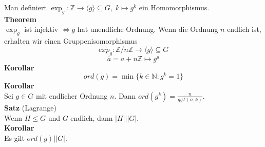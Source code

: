\documentclass[a4paper, 12pt]{article}
\begin{document}
Man definiert $\exp_g: \mathbb{Z} \to \langle g \rangle \subseteq G, \; k \mapsto g^k$ ein Homomorphismus.\\
\textbf{Theorem}\\
$\exp_g$ ist injektiv $\Leftrightarrow g$ hat unendliche Ordnung. Wenn die Ordnung $n$ endlich ist, erhalten wir einen Gruppenisomorphismus \[exp_g: \mathbb{Z}/ n\mathbb{Z} \to \langle g\rangle \subseteq G\]\[\overline{a} = a+n\mathbb{Z} \mapsto g^a\]
\textbf{Korollar}
\[ord(g) = \min\{k \in \mathbb{N}: g^k = 1\}\]
\textbf{Korollar}\\
Sei $g \in G$ mit endlicher Ordnung $n$. Dann $ord(g^k) = \frac{n}{ggT(n,k)}$.\\
\textbf{Satz} (Lagrange)\\
Wenn $H\leq G$ und $G$ endlich, dann $\left|H\right| | \left| G \right|$.\\
\textbf{Korollar}\\
Es gilt $ord(g) | \left|G\right|$.
\end{document}
